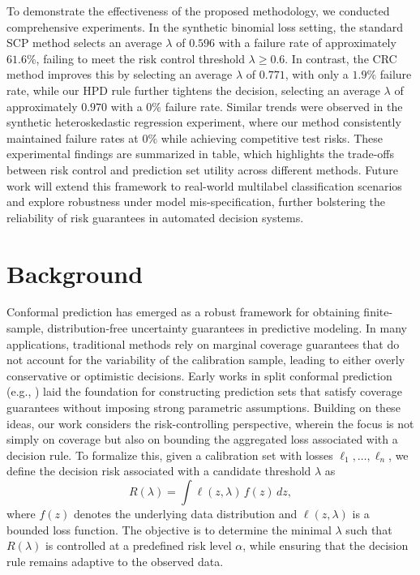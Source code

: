 \documentclass{article} %
\begin{document}
To demonstrate the effectiveness of the proposed methodology, we conducted comprehensive experiments. In the synthetic binomial loss setting, the standard SCP method selects an average $\lambda$ of $0.596$ with a failure rate of approximately $61.6\%$, failing to meet the risk control threshold $\lambda \geq 0.6$. In contrast, the CRC method improves this by selecting an average $\lambda$ of $0.771$, with only a $1.9\%$ failure rate, while our HPD rule further tightens the decision, selecting an average $\lambda$ of approximately $0.970$ with a $0\%$ failure rate. Similar trends were observed in the synthetic heteroskedastic regression experiment, where our method consistently maintained failure rates at $0\%$ while achieving competitive test risks. These experimental findings are summarized in table, which highlights the trade-offs between risk control and prediction set utility across different methods. Future work will extend this framework to real-world multilabel classification scenarios and explore robustness under model mis-specification, further bolstering the reliability of risk guarantees in automated decision systems.

\section{Background}
Conformal prediction has emerged as a robust framework for obtaining finite-sample, distribution‐free uncertainty guarantees in predictive modeling. In many applications, traditional methods rely on marginal coverage guarantees that do not account for the variability of the calibration sample, leading to either overly conservative or optimistic decisions. Early works in split conformal prediction (e.g., \cite{hulsman2022distributionfreefinitesampleguaranteessplit}) laid the foundation for constructing prediction sets that satisfy coverage guarantees without imposing strong parametric assumptions. Building on these ideas, our work considers the risk-controlling perspective, wherein the focus is not simply on coverage but also on bounding the aggregated loss associated with a decision rule. To formalize this, given a calibration set with losses $\ell_1, \dots, \ell_n$, we define the decision risk associated with a candidate threshold $\lambda$ as
\[
R(\lambda) = \int \ell(z,\lambda) \, f(z)\,dz,
\]
where $f(z)$ denotes the underlying data distribution and $\ell(z,\lambda)$ is a bounded loss function. The objective is to determine the minimal $\lambda$ such that $R(\lambda)$ is controlled at a predefined risk level $\alpha$, while ensuring that the decision rule remains adaptive to the observed data.
\end{document}
